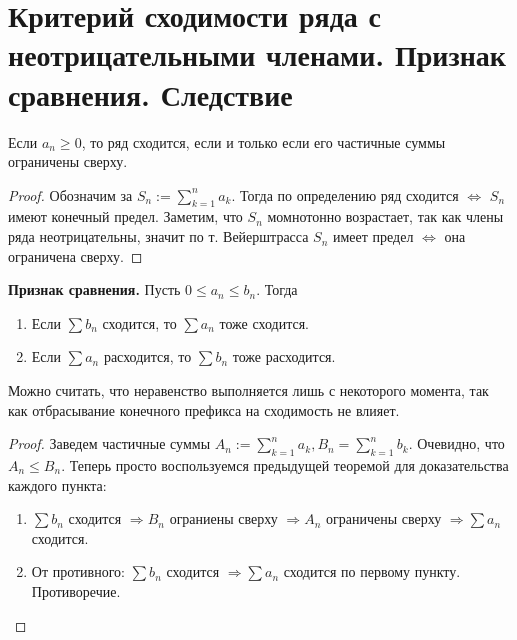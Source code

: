 \section{Критерий сходимости ряда с неотрицательными членами. Признак сравнения. Следствие}
\begin{theorem}
    Если $a_n \geqslant 0$, то ряд сходится, если и только если его частичные суммы ограничены сверху.
\end{theorem}
\begin{proof}
    Обозначим за $S_n := \sum\limits_{k=1}^n a_k$. 
    Тогда по определению ряд сходится $\Leftrightarrow$ $S_n$ имеют конечный предел.
    Заметим, что $S_n$ момнотонно возрастает, так как члены ряда неотрицательны, значит по т. Вейерштрасса $S_n$ имеет предел $\Leftrightarrow$ она ограничена сверху.
\end{proof}

\vspace{4mm}

\textbf{Признак сравнения.} 
Пусть $0 \leqslant a_n \leqslant b_n$. 
Тогда \begin{enumerate}
    \item Если $\sum b_n$ сходится, то $\sum a_n$ тоже сходится.
    \item Если $\sum a_n$ расходится, то $\sum b_n$ тоже расходится.
\end{enumerate}
Можно считать, что неравенство выполняется лишь с некоторого момента, так как отбрасывание конечного префикса на сходимость не влияет.
\begin{proof}
    Заведем частичные суммы $A_n := \sum\limits_{k=1}^n a_k, B_n = \sum\limits_{k=1}^n b_k$.
    Очевидно, что $A_n \leqslant B_n$.
    Теперь просто воспользуемся предыдущей теоремой для доказательства каждого пункта:
    \begin{enumerate}
        \item $\sum b_n$ сходится $\Rightarrow B_n$ ограниены сверху $\Rightarrow A_n$ ограничены сверху $\Rightarrow \sum a_n$ сходится. 
        \item От противного: $\sum b_n$ сходится $\Rightarrow \sum a_n$ сходится по первому пункту. Противоречие. 
    \end{enumerate}
\end{proof}

